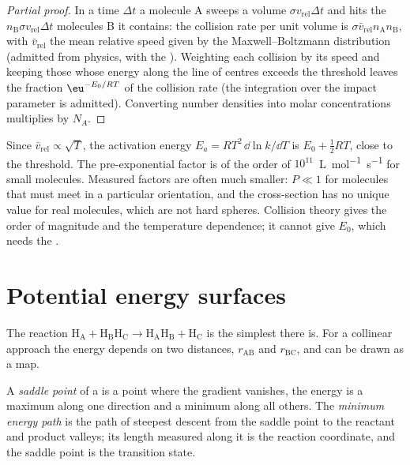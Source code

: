 \begin{proof}[Partial proof]
In a time $\Delta t$ a molecule A sweeps a volume $\sigma v_{\mathrm{rel}}\Delta t$ and hits the
$n_{\mathrm B}\sigma v_{\mathrm{rel}}\Delta t$ molecules B it contains: the collision rate per unit volume
is $\sigma\bar v_{\mathrm{rel}}n_{\mathrm A}n_{\mathrm B}$, with $\bar v_{\mathrm{rel}}$ the mean relative speed given by the
Maxwell--Boltzmann distribution (admitted from physics, with the ). Weighting each collision by its speed and keeping those whose energy
along the line of centres exceeds the threshold leaves the fraction
$\eu^{-E_0/RT}$ of the collision rate (the integration over the impact parameter is
admitted). Converting number densities into molar concentrations multiplies by
$N_A$.
\end{proof}

Since $\bar v_{\mathrm{rel}} \propto \sqrt T$, the activation energy $E_a = RT^2\,\dd\ln k/\dd T$ is $E_0 + \frac12RT$,
close to the threshold. The pre-exponential factor is of the order of
$10^{11}$~\unit{L.mol^{-1}.s^{-1}} for small molecules. Measured factors are often
much smaller: $P \ll 1$ for molecules that must meet in a particular
orientation, and the cross-section has no unique value for real molecules,
which are not hard spheres. Collision theory gives the order of magnitude and
the temperature dependence; it cannot give $E_0$, which needs the .

\section{Potential energy surfaces}

The reaction $\mathrm{H_A + H_BH_C \to H_AH_B + H_C}$ is the simplest there is. For a collinear
approach the energy depends on two distances, $r_{\mathrm{AB}}$ and $r_{\mathrm{BC}}$, and can be drawn
as a map.

\begin{definition}\label{def:b3:rate-theories:saddle}
A \emph{saddle point} of a  is a point
where the gradient vanishes, the energy is a maximum along one direction and a
minimum along all others. The \emph{minimum energy path}
is the path of steepest descent from the saddle point to the reactant
and product valleys; its length measured along it is the reaction coordinate,
and the saddle point is the transition state.
\end{definition}

